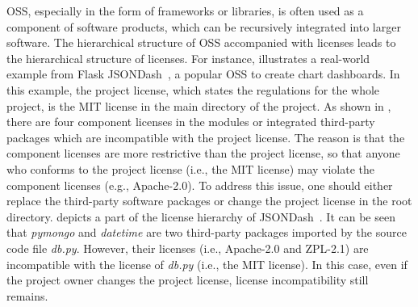 OSS, especially in the form of frameworks or libraries, is often used as a component of software products, which can be recursively integrated into larger software. 
The hierarchical structure of OSS accompanied with licenses leads to the hierarchical structure of licenses. 
 For instance,  illustrates a real-world example from Flask JSONDash~\cite{url-example1}, {a popular OSS to create chart dashboards}. In this example, the project license, which states the regulations for the whole project, is the MIT license in the main directory of the project. As shown in , there are four component licenses in the modules or integrated third-party packages which are incompatible with the project license. The reason is that the component licenses are more restrictive than the project license, so that anyone who conforms to the project license (i.e., the MIT license) may violate the component licenses (e.g., Apache-2.0). To address this issue, one should either replace the third-party software packages or change the project license in the root directory.
  depicts a part of the license hierarchy of JSONDash~\cite{url-example1}. It can be seen that \textit{pymongo} and \textit{datetime} are two third-party packages imported by the source code file \textit{db.py}. However, their licenses (i.e., Apache-2.0 and ZPL-2.1) are incompatible with the license of \textit{db.py} (i.e., the MIT license). In this case, even if the project owner changes the project license, license incompatibility still remains. %


